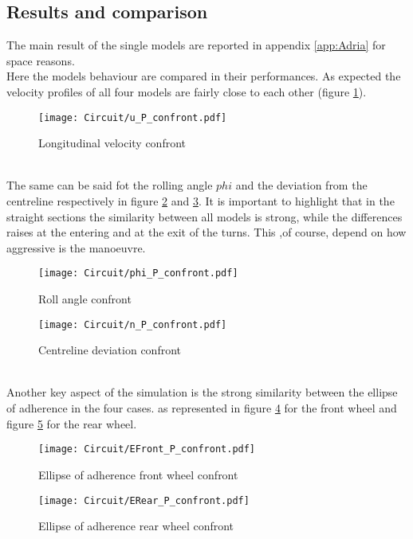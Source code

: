 \subsection{Results and comparison}
%
The main result of the single models are reported in appendix \ref{app:Adria} for space reasons.\\
Here the models behaviour are compared in their performances. As expected the velocity profiles of all four models are fairly close to each other (figure \ref{fig:AdriaUconfront}).\\
%
\begin{figure}[!htb]
    \centering
    \texttt{[image: Circuit/u\_P\_confront.pdf]}
    \caption{Longitudinal velocity confront}
    \label{fig:AdriaUconfront}
\end{figure}\\
%
The same can be said fot the rolling angle $phi$ and the deviation from the centreline respectively in figure \ref{fig:AdriaPHIconfront} and \ref{fig:AdriaNconfront}. It is important to highlight that in the straight sections the similarity between all models is strong, while the differences raises at the entering and at the exit of the turns. This ,of course, depend on how aggressive is the manoeuvre.\\
%
\begin{figure}[!htb]
    \centering
    \texttt{[image: Circuit/phi\_P\_confront.pdf]}
    \caption{Roll angle confront}
    \label{fig:AdriaPHIconfront}
\end{figure}
%
%
\begin{figure}[!htb]
    \centering
    \texttt{[image: Circuit/n\_P\_confront.pdf]}
    \caption{Centreline deviation confront}
    \label{fig:AdriaNconfront}
\end{figure}\\
%
Another key aspect of the simulation is the strong similarity between the ellipse of adherence in the four cases. as represented in figure \ref{fig:AdriaEF} for the front wheel and figure \ref{fig:AdriaER} for the rear wheel.\\
%
\begin{figure}[!htb]
    \centering
    \texttt{[image: Circuit/EFront\_P\_confront.pdf]}
    \caption{Ellipse of adherence front wheel confront}
    \label{fig:AdriaEF}
\end{figure}
%
\begin{figure}[!htb]
    \centering
    \texttt{[image: Circuit/ERear\_P\_confront.pdf]}
    \caption{Ellipse of adherence rear wheel confront}
    \label{fig:AdriaER}
\end{figure}\\
